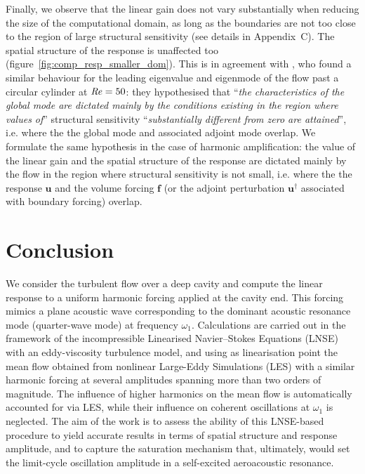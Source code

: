 \documentclass[11pt,onecolumn]{article}
\def\ff {\mathbf{f}}
\def\uu {\mathbf{u}}
\newcommand\Rey{\mbox{\textit{Re}}}
\begin{document}
Finally, we observe that the linear gain does not vary substantially when reducing the size of the computational domain, as long as the boundaries are not too close to the region of large  structural sensitivity (see details in Appendix~C). 
The spatial structure of the response is unaffected too (figure~\ref{fig:comp_resp_smaller_dom}). 
This is in agreement with \cite{Giannetti07}, who found a similar behaviour for the leading eigenvalue and eigenmode of the flow past a circular cylinder at $\Rey=50$:
they hypothesised that ``\textit{the characteristics of the global mode are dictated mainly by the conditions existing in the region where values of}'' structural sensitivity ``\textit{substantially different from zero are attained}'', i.e. where the the global mode and associated adjoint mode overlap.
We  formulate the same hypothesis in the case of  harmonic amplification: the value of the linear gain and the spatial structure of the response are dictated mainly by the flow in the region where  structural sensitivity is not small, i.e. where the the response $\uu$ 
and the volume forcing $\ff$ (or the adjoint perturbation $\uu^\dag$ associated with boundary forcing) overlap.


\section{Conclusion}
\label{sec:conclu}

We consider the turbulent flow over a deep cavity and compute the linear response to a uniform harmonic forcing applied at the cavity end. 
This forcing mimics a plane acoustic wave corresponding to the dominant  acoustic resonance mode (quarter-wave mode) at frequency $\omega_1$.
Calculations are carried out in the framework of the incompressible Linearised Navier--Stokes Equations (LNSE) with an eddy-viscosity turbulence model, and using as linearisation point the mean flow obtained from nonlinear Large-Eddy Simulations (LES) with a similar harmonic forcing at several amplitudes spanning more than two orders of magnitude. 
The influence of higher harmonics on the mean flow is automatically accounted for via LES, while their influence on coherent oscillations at $\omega_1$ is neglected.
The aim of the work is to assess the ability of this LNSE-based procedure to yield accurate results in terms of spatial structure and response amplitude, and to capture the saturation mechanism that, ultimately, would set the limit-cycle oscillation amplitude in a self-excited aeroacoustic resonance.
\end{document}
